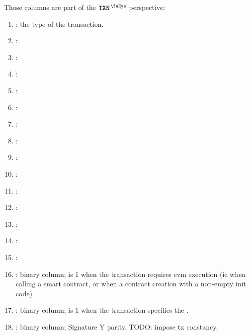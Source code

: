 Those columns are part of the $\isTxn$ perspective:
\begin{enumerate}
    \item
	\markAsJustifiedHere{}
	\rlpTxnTransactionColumnTxType{}:
	the type of the transaction.
    \item
	\markAsJustifiedHere{}
	\rlpTxnTransactionColumnIsDep{}:
    \item
	\markAsJustifiedHere{}
	\rlpTxnTransactionColumnChainId{}:
    \item
	\markAsJustifiedHere{}
	\rlpTxnTransactionColumnNonce{}:
    \item
	\markAsJustifiedHere{}
	\rlpTxnTransactionColumnGasPrice{}:
    \item
	\markAsJustifiedHere{}
	\rlpTxnTransactionColumnMaxPriorityFeePerGas{}:
    \item
	\markAsJustifiedHere{}
	\rlpTxnTransactionColumnMaxFeePerGas{}:
    \item
	\markAsJustifiedHere{}
	\rlpTxnTransactionColumnGasLimit{}:
    \item
	\rlpTxnTransactionColumnToHi{}:
    \item
	\rlpTxnTransactionColumnToLo{}:
    \item
	\markAsJustifiedHere{}
	\rlpTxnTransactionColumnTxnValue{}:
    \item
	\markAsJustifiedHere{}
	\rlpTxnTransactionColumnNumberOfZero{}:
    \item
	\markAsJustifiedHere{}
	\rlpTxnTransactionColumnNumberOfNonZero{}:
    \item
	\markAsJustifiedHere{}
	\rlpTxnTransactionColumnNbWarmedAddress{}:
    \item
	\markAsJustifiedHere{}
	\rlpTxnTransactionColumnNbWarmedStorageKey{}:
    \item
	\rlpTxnTransactionColumnRequiresEvmExecution{}:
	binary column; is 1 when the transaction requires evm execution (ie when calling a smart contract, or when a contract creation with a non-empty init code)
	\item
	\rlpTxnTransactionColumnChainlessTransaction{}:
	binary column; is 1 when the transaction specifies the \chainId{}.
	\item
	\rlpTxnTransactionColumnY{}:
	binary column; Signature Y parity. TODO: impose tx constancy.
	
\end{enumerate}

